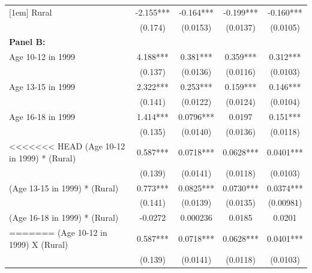 \documentclass[12pt,letterpaper]{article}
\newcommand{\0}{\ensuremath{\mbox{\boldmath $0$}}}
\begin{document}
\begin{table}[h!]
\begin{center}
{{\begin{tabular}{lcccc}
	[1em]
	Rural                                      &      -2.155***&      -0.164***&      -0.199***&      -0.160***\\
	                                              &     (0.174)         &    (0.0153)         &    (0.0137)         &    (0.0105)         \\
	[1em]
	{\textbf{Panel B:}}                         &                   &                       &                   &                   \\
	Age 10-12 in 1999                            &       4.188***&       0.381***&       0.359***&       0.312***\\
	                                            &     (0.137)         &    (0.0136)         &    (0.0116)         &    (0.0103)         \\
	[1em]
	Age 13-15 in 1999                            &       2.322***&       0.253***&       0.159***&       0.146***\\
	                                            &     (0.141)         &    (0.0122)         &    (0.0124)         &    (0.0104)         \\
	[1em]
	Age 16-18 in 1999                           &       1.414***&      0.0796***&      0.0197         &       0.151***\\
	                                            &     (0.135)         &    (0.0140)         &    (0.0136)         &    (0.0118)         \\
	[1em]
<<<<<<< HEAD
	(Age 10-12 in 1999) * (Rural)               &     0.587***&      0.0718***&      0.0628***&      0.0401***\\
	                                            &     (0.139)         &    (0.0141)         &    (0.0118)         &    (0.0103)         \\
	[1em]
	(Age 13-15 in 1999) * (Rural)              &       0.773***&      0.0825***&      0.0730***&      0.0374***\\
	                                            &     (0.141)         &    (0.0139)         &    (0.0135)         &   (0.00981)         \\
	[1em]
	(Age 16-18 in 1999) * (Rural)               &     -0.0272         &    0.000236         &      0.0185         &      0.0201         \\
=======
	(Age 10-12 in 1999) X (Rural)               &     0.587***&      0.0718***&      0.0628***&      0.0401***\\
	                                            &     (0.139)         &    (0.0141)         &    (0.0118)         &    (0.0103)         \\

\end{tabular}}}
\end{center}
\end{table}
\end{document}

